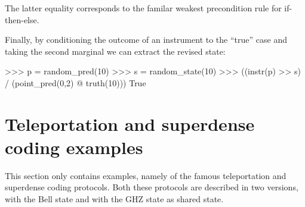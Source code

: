 \documentclass[leqno]{tufte-book} %
\begin{document}
\noindent The latter equality corresponds to the familar weakest
precondition rule for if-then-else.

Finally, by conditioning the outcome of an instrument to the ``true''
case and taking the second marginal we can extract the revised state:
\begin{python}
>>> p = random_pred(10)
>>> s = random_state(10)
>>> ((instr(p) >> s) / (point_pred(0,2) @ truth(10))) %
True
\end{python}


\section{Teleportation and superdense coding examples}\label{sec:teleportation}

This section only contains examples, namely of the famous
teleportation and superdense coding protocols. Both these protocols
are described in two versions, with the Bell state and with the GHZ
state as shared state.
\end{document}
